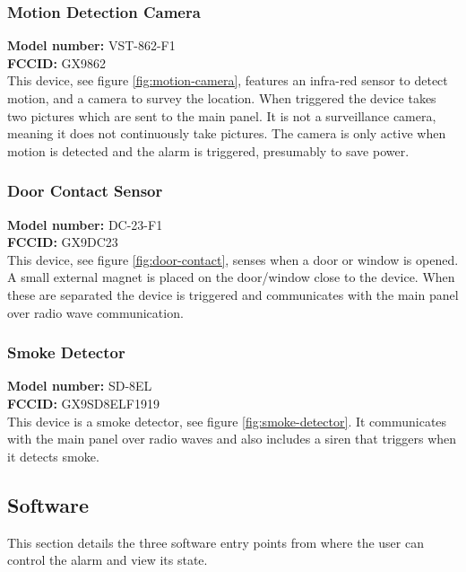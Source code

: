 \subsubsection{Motion Detection Camera}
\textbf{Model number:} VST-862-F1 \\
\textbf{FCCID:} GX9862 \\
This device, see figure \ref{fig:motion-camera}, features an infra-red sensor to detect motion, and a camera to survey the location. When triggered the device takes two pictures which are sent to the main panel. It is not a surveillance camera, meaning it does not continuously take pictures. The camera is only active when motion is detected and the alarm is triggered, presumably to save power.

\subsubsection{Door Contact Sensor}
\textbf{Model number:} DC-23-F1 \\
\textbf{FCCID:} GX9DC23 \\
This device, see figure \ref{fig:door-contact}, senses when a door or window is opened. A small external magnet is placed on the door/window close to the device. When these are separated the device is triggered and communicates with the main panel over radio wave communication.

\subsubsection{Smoke Detector}
\textbf{Model number:} SD-8EL \\
\textbf{FCCID:} GX9SD8ELF1919 \\
This device is a smoke detector, see figure \ref{fig:smoke-detector}. It communicates with the main panel over radio waves and also includes a siren that triggers when it detects smoke.

\subsection{Software} \label{ch:system:software}
This section details the three software entry points from where the user can control the alarm and view its state.

